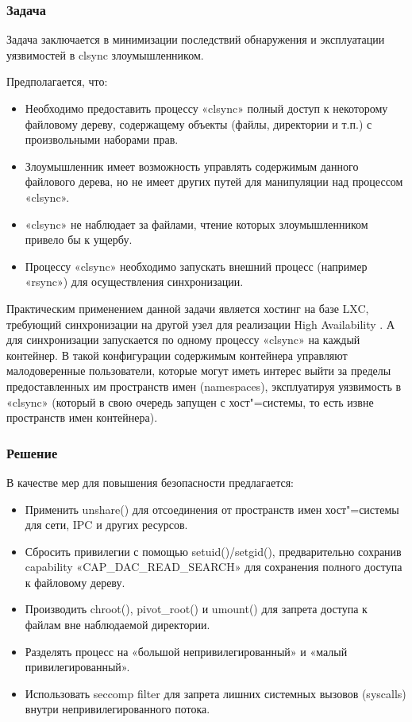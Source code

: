 \documentclass[10pt, a5paper]{article}
\begin{document}
\subsubsection*{Задача}

Задача заключается в минимизации последствий обнаружения и эксплуатации уязвимостей в clsync злоумышленником.

Предполагается, что:

\begin{itemize}
  \item Необходимо предоставить процессу «clsync» полный доступ к некоторому файловому дереву, содержащему объекты (файлы, директории и т.п.) с произвольными наборами прав.
  \item Злоумышленник имеет возможность управлять содержимым данного файлового дерева, но не имеет других путей для манипуляции над процессом «clsync».
  \item «clsync» не наблюдает за файлами, чтение которых злоумышленником привело бы к ущербу.
  \item Процессу «clsync» необходимо запускать внешний процесс (например «rsync») для осуществления синхронизации.
\end{itemize}

Практическим применением данной задачи является хостинг на базе LXC, требующий синхронизации на другой узел для реализации High Availability \cite{Okunev1, Okunev6}. А для синхронизации запускается по одному процессу «clsync» на каждый контейнер. В такой конфигурации содержимым контейнера управляют малодоверенные пользователи, которые могут иметь интерес выйти за пределы предоставленных им пространств имен (namespaces), эксплуатируя уязвимость в «clsync» (который в свою очередь запущен с хост"=системы, то есть извне пространств имен контейнера).

\subsubsection*{Решение}

В качестве мер для повышения безопасности предлагается:

\begin{itemize}
  \item Применить unshare() \cite{Okunev7} для отсоединения от пространств имен хост"=системы для сети, IPC и других ресурсов.
  \item Сбросить привилегии с помощью setuid()/setgid(), предварительно сохранив capability «CAP\_DAC\_READ\_SEARCH» \linebreak для сохранения полного доступа к файловому дереву.
  \item Производить chroot(), pivot\_root() \cite{Okunev8} и umount() для запрета доступа к файлам вне наблюдаемой директории.
  \item Разделять процесс на «большой непривилегированный» и «малый привилегированный».
  \item Использовать seccomp filter \cite{Okunev9} для запрета лишних системных вызовов (syscalls) внутри непривилегированного потока.
\end{itemize}
\end{document}
